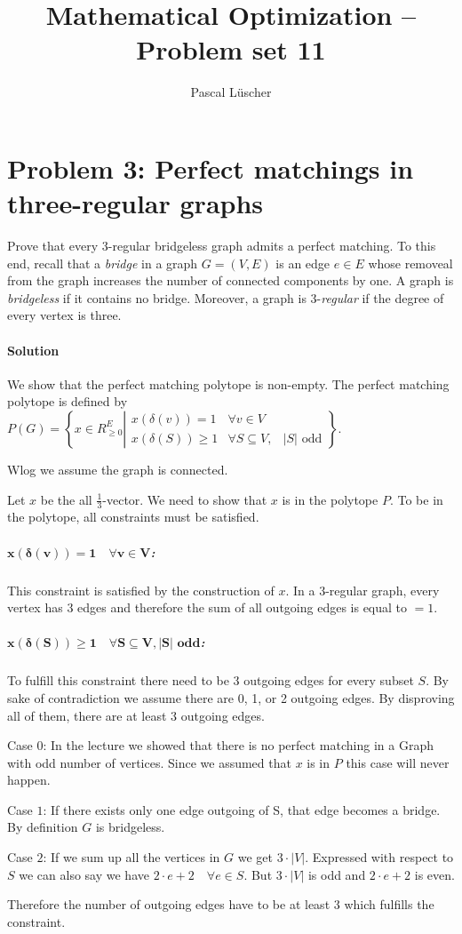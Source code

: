 \documentclass[12pt, a4]{article}
\author{Pascal Lüscher}
\title{Mathematical Optimization – Problem set 11}
\begin{document}
\section{Problem 3: Perfect matchings in three-regular graphs}
Prove that every 3-regular bridgeless graph admits a perfect matching. To this end, recall that a \emph{bridge} in a graph $G=(V,E)$ is an edge $e\in E$ whose removeal from the graph increases the number of connected components by one. A graph is \emph{bridgeless} if it contains no bridge. Moreover, a graph is $3$-\emph{regular} if the degree of every vertex is three.
\paragraph{Solution}
We show that the perfect matching polytope is non-empty. The perfect matching polytope is defined by $P(G) = \left \{ x\in R^E_{\geq 0} \left|\begin{matrix}
	x(\delta(v)) = 1 & \forall v \in V \\ 
	x(\delta(S)) \geq 1 & \forall S \subseteq V,& |S|\text{ odd}
\end{matrix}\right. \right\}$. 

Wlog we assume the graph is connected.

Let $x$ be the all $\frac{1}{3}$-vector. We need to show that $x$ is in the polytope $P$.
To be in the polytope, all constraints must be satisfied.

\subparagraph{$\bm{x(\delta(v)) = 1 \quad \forall v \in V}$:}
This constraint is satisfied by the construction of $x$. In a $3$-regular graph, every vertex has $3$ edges and therefore the sum of all outgoing edges is equal to $=1$.

\subparagraph{$\bm{x(\delta(S)) \geq 1 \quad \forall S \subseteq V, |S|\text{ odd}}$:}
To fulfill this constraint there need to be 3 outgoing edges for every subset $S$.
By sake of contradiction we assume there are 0, 1, or 2 outgoing edges. By disproving all of them, there are at least 3 outgoing edges.

Case  $0$:
In the lecture we showed that there is no perfect matching in a Graph with odd number of vertices. Since we assumed that $x$ is in $P$ this case will never happen. \Lightning

Case $1$:
If there exists only one edge outgoing of S, that edge becomes a bridge. By definition $G$ is bridgeless. \Lightning

Case $2$:
If we sum up all the vertices in $G$ we get $3\cdot|V|$. Expressed with respect to $S$ we can also say we have $2\cdot e +2 \quad  \forall e\in S$. But $3\cdot|V|$ is odd and $2\cdot e +2$ is even. \Lightning

Therefore the number of outgoing edges have to be at least $3$ which fulfills the constraint.
\end{document}
